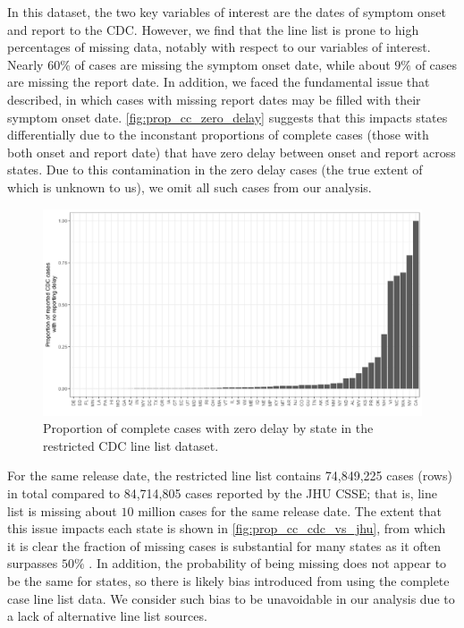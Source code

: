 \documentclass{article}
\begin{document}
In this dataset, the two key variables of interest are the dates of symptom onset and report to the CDC. However, we find that the line list is prone to high percentages of missing data, notably with respect to our variables of interest. Nearly $60\%$ of cases are missing the symptom onset date, while about $9\%$ of cases are missing the report date. In addition, we faced the fundamental issue that \citet{jahja2022real} described, in which cases with missing report dates may be filled with their symptom onset date. \autoref{fig:prop_cc_zero_delay} suggests that this impacts states differentially due to the inconstant proportions of complete cases (those with both onset and report date) that have zero delay between onset and report across states. Due to this contamination in the zero delay cases (the true extent of which is unknown to us), we omit all such cases from our analysis.

\begin{figure}[!tb]
\centering
    \includegraphics[width=.99\textwidth]{prop_cc_zero_delay.pdf}
    \caption{Proportion of complete cases with zero delay by state in the restricted CDC line list dataset.}
    \label{fig:prop_cc_zero_delay}
\end{figure}

For the same release date, the restricted line list contains 74,849,225 cases (rows) in total compared to 84,714,805 cases reported by the JHU CSSE; that is, line list is missing about $10$ million cases for the same release date. The extent that this issue impacts each state is shown in \autoref{fig:prop_cc_cdc_vs_jhu}, from which it is clear the fraction of missing cases is substantial for many states as it often surpasses $50\%$ \citep{jahja2022real}. In addition, the probability of being missing does not appear to be the same for states, so there is likely bias introduced from using the complete case line list data. We consider such bias to be unavoidable in our analysis due to a lack of alternative line list sources.
\end{document}
